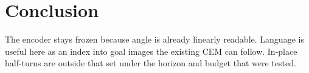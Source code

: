 \documentclass[11pt,a4paper]{article}
\begin{document}
\section{Conclusion}
The encoder stays frozen because angle is already linearly readable.
Language is useful here as an index into goal images the existing CEM can follow.
In-place half-turns are outside that set under the horizon and budget that were tested.



\end{document}
